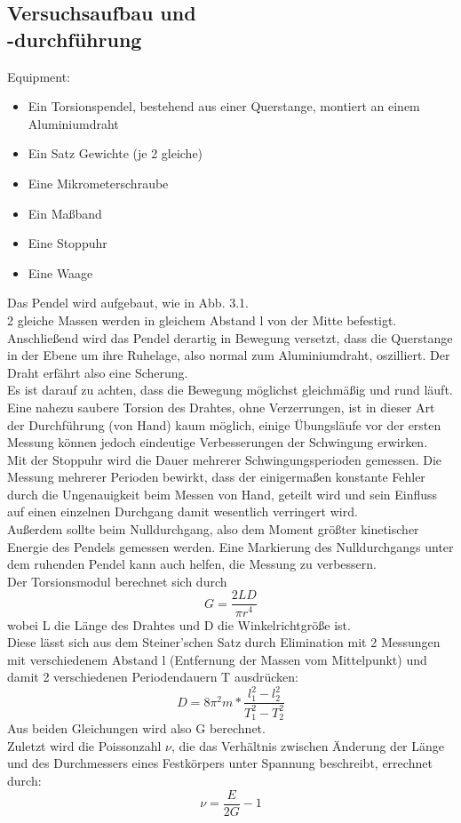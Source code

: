 \documentclass[12pt,a4paper]{article}
\begin{document}
\begin{multicols}{2}
\subsection{Versuchsaufbau und \\-durchführung}
Equipment:
\begin{itemize}
	\item Ein Torsionspendel, bestehend aus einer Querstange, montiert an einem Aluminiumdraht
	\item Ein Satz Gewichte (je 2 gleiche)
	\item Eine Mikrometerschraube
	\item Ein Maßband
	\item Eine Stoppuhr
	\item Eine Waage
\end{itemize}
Das Pendel wird aufgebaut, wie in Abb. 3.1.\\
2 gleiche Massen werden in gleichem Abstand l von der Mitte befestigt. Anschließend wird das Pendel derartig in Bewegung versetzt, dass die Querstange in der Ebene um ihre Ruhelage, also normal zum Aluminiumdraht, oszilliert. Der Draht erfährt also eine Scherung.\\
Es ist darauf zu achten, dass die Bewegung möglichst gleichmäßig und rund läuft. Eine nahezu saubere Torsion des Drahtes, ohne Verzerrungen, ist in dieser Art der Durchführung (von Hand) kaum möglich, einige Übungsläufe vor der ersten Messung können jedoch eindeutige Verbesserungen der Schwingung erwirken.\\
Mit der Stoppuhr wird die Dauer mehrerer Schwingungsperioden gemessen. Die Messung mehrerer Perioden bewirkt, dass der einigermaßen konstante Fehler durch die Ungenauigkeit beim Messen von Hand, geteilt wird und sein Einfluss auf einen einzelnen Durchgang damit wesentlich verringert wird.\\
Außerdem sollte beim Nulldurchgang, also dem Moment größter kinetischer Energie des Pendels gemessen werden. Eine Markierung des Nulldurchgangs unter dem ruhenden Pendel kann auch helfen, die Messung zu verbessern.\\
Der Torsionsmodul berechnet sich durch\\
$$G = \frac{2LD}{\pi r^4}$$
wobei L die Länge des Drahtes und D die Winkelrichtgröße ist.\\
Diese lässt sich aus dem Steiner'schen Satz durch Elimination mit 2 Messungen mit verschiedenem Abstand l (Entfernung der Massen vom Mittelpunkt) und damit 2 verschiedenen Periodendauern T ausdrücken:\\
$$ D=8\pi ^2 m* \frac{l_1^2-l_2^2}{T_1^2-T_2^2}$$
Aus beiden Gleichungen wird also G berechnet.\\
Zuletzt wird die Poissonzahl $\nu$, die das Verhältnis zwischen Änderung der Länge und des Durchmessers eines Festkörpers unter Spannung beschreibt, errechnet durch:\\
$$ \nu = \frac{E}{2G}-1$$


\end{multicols}
\end{document}
